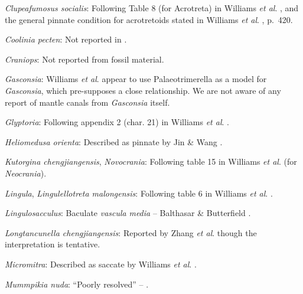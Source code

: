 \documentclass[openany]{book}
\theoremstyle{definition}
\theoremstyle{definition}
\theoremstyle{definition}
\theoremstyle{remark}
\begin{document}
\hypertarget{Clupeafumosus_socialis-coding-92}{}
\emph{Clupeafumosus socialis}: Following Table 8 (for Acrotreta) in
Williams \emph{et al}.
\citeyearpar{Williams2000LinguliformeaCraniiformea}, and the general
pinnate condition for acrotretoids stated in Williams \emph{et al}.
\citeyearpar{Williams1997Introduction}, p.~420.

\hypertarget{Coolinia_pecten-coding-92}{}
\emph{Coolinia pecten}: Not reported in
\citet{Williams2000LinguliformeaCraniiformea}.

\hypertarget{Craniops-coding-92}{}
\emph{Craniops}: Not reported from fossil material.

\hypertarget{Gasconsia-coding-92}{}
\emph{Gasconsia}: Williams \emph{et al}. \citeyearpar[table
15]{Williams2000LinguliformeaCraniiformea} appear to use
Palaeotrimerella \citep[as drawn in][]{Williams1997Introduction} as a
model for \emph{Gasconsia}, which pre-supposes a close relationship. We
are not aware of any report of mantle canals from \emph{Gasconsia}
itself.

\hypertarget{Glyptoria-coding-92}{}
\emph{Glyptoria}: Following appendix 2 (char. 21) in Williams \emph{et
al}. \citeyearpar{Williams1998Thediversity}.

\hypertarget{Heliomedusa_orienta-coding-92}{}
\emph{Heliomedusa orienta}: Described as pinnate by Jin \& Wang
\citeyearpar{Jin1992Revisionof}.

\hypertarget{Kutorgina_chengjiangensis-coding-92}{}
\emph{Kutorgina chengjiangensis}, \emph{Novocrania}: Following table 15
in Williams \emph{et al}.
\citeyearpar{Williams2000LinguliformeaCraniiformea} (for
\emph{Neocrania}).

\hypertarget{Lingula-coding-92}{}
\emph{Lingula}, \emph{Lingulellotreta malongensis}: Following table 6 in
Williams \emph{et al}.
\citeyearpar{Williams2000LinguliformeaCraniiformea}.

\hypertarget{Lingulosacculus-coding-92}{}
\emph{Lingulosacculus}: Baculate \emph{vascula} \emph{media} --
Balthasar \& Butterfield \citeyearpar{Balthasar2009EarlyCambrian}.

\hypertarget{Longtancunella_chengjiangensis-coding-92}{}
\emph{Longtancunella chengjiangensis}: Reported by Zhang \emph{et al}.
\citeyearpar[2011T]{Zhang2007Agregarious} though the interpretation is
tentative.

\hypertarget{Micromitra-coding-92}{}
\emph{Micromitra}: Described as saccate by Williams \emph{et al}.
\citeyearpar{Williams1998Thediversity}.

\hypertarget{Mummpikia_nuda-coding-92}{}
\emph{Mummpikia nuda}: ``Poorly resolved'' --
\citet{Balthasar2008iMummpikia}.
\end{document}
